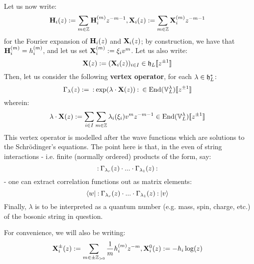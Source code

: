             Let us now write:
                $$\mathbf{H}_i(z) := \sum_{m \in \mathbb{Z}} \mathbf{H}_i^{(m)} z^{-m - 1}, \mathbf{X}_i(z) := \sum_{m \in \mathbb{Z}} \mathbf{X}_i^{(m)} z^{-m - 1}$$
            for the Fourier expansion of $\mathbf{H}_i(z)$ and $\mathbf{X}_i(z)$; by construction, we have that $\mathbf{H}_i^{(m)} = h_i^{(m)}$, and let us set $\mathbf{X}_i^{(m)} := \xi_i v^m$. Let us also write:
                $$\mathbf{X}(z) := ( \mathbf{X}_i(z) )_{i \in I} \in \mathfrak{h}_L[\![z^{\pm 1}]\!]$$
            Then, let us consider the following \textbf{vertex operator}, for each $\lambda \in \mathfrak{h}_L^*$:
                $$\Gamma_{\lambda}(z) := \: \mathbf{:} \: { \exp( \lambda \cdot \mathbf{X}(z) ) }  \: \mathbf{:} \: \in \mathrm{End}(\mathbb{V}_L^{\lambda})[\![z^{\pm 1}]\!]$$
            wherein:
                $$\lambda \cdot \mathbf{X}(z) := \sum_{i \in I} \sum_{m \in \mathbb{Z}} \lambda_i(\xi_i) v^m z^{-m - 1} \in \mathrm{End}(\mathbb{V}_L^{\lambda})[\![z^{\pm 1}]\!]$$
            This vertex operator is modelled after the wave functions which are solutions to the Schr\"odinger's equations. The point here is that, in the even of string interactions - i.e. finite (normally ordered) products of the form, say:
                $$\: \mathbf{:} \: { \Gamma_{\lambda_r}(z) \cdot ... \cdot \Gamma_{\lambda_1}(z) }  \: \mathbf{:} \:$$
            - one can extract correlation functions out as matrix elements:
                $$\langle {w} \rvert \: \mathbf{:} \: { \Gamma_{\lambda_r}(z) \cdot ... \cdot \Gamma_{\lambda_1}(z) }  \: \mathbf{:} \: \lvert {v} \rangle$$
            Finally, $\lambda$ is to be interpreted as a quantum number (e.g. mass, spin, charge, etc.) of the bosonic string in question.

            \begin{convention}
                For convenience, we will also be writing:
                    $$\mathbf{X}_i^{\pm}(z) := \sum_{m \in \pm \mathbb{Z}_{> 0}} \frac1m h_i^{(m)} z^{-m}, \mathbf{X}_i^0(z) := -h_i \log(z)$$
            \end{convention}
            
